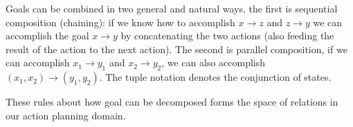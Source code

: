 Goals can be combined in two general and natural ways, the first is sequential composition (chaining): if we know how to accomplish $x\to z$ and $z\to y$ we can accomplish the goal $x \to y$ by concatenating the two actions (also feeding the result of the action to the next action). The second is parallel composition, if we can accomplish $x_1 \to y_1$ and $x_2 \to y_2$, we can also accomplish $(x_1,x_2) \to (y_1,y_2)$. The tuple notation denotes the conjunction of states. 

These rules about how goal can be decomposed forms the space of relations in our action planning domain.

\newcommand{\actionType}{
    \begin{minipage}{0.6\linewidth}
        {\begin{align*}
        \text{types} &= \{ \text{$s_1 \to s_2$ | $s_1,s_2 \in \text{WorldState}$} \}\\
        \text{WorldState} &= \{\text{Having $q$ | $q \in$ Quantified} \} \\
        &\cup \{\text{$x$ in machine | $x\in$ Quantified\}}\\
        &\cup \text{WorldState $\times$ WorldState}\\
        \text{Quantified} &= \{\text{$x$ amount of $y$ | $x \in\mathbb{R}\times$Unit, $y\in$ Entity}\}\\
        \text{Unit} &= \{\text{gram, milliliter, cup}\}\\
        \text{Entitiy} &= \{\text{coffee ground, coffee, water}\}
        \end{align*}}
    \end{minipage}
}



\newcommand{\actionToken}{
    \def\arraystretch{1}%
    \begin{Bmatrix}
        {\color{gray}\textbf{put $x$ in machine}} \\
        {\color{gray}\textbf{measure $x$ amount of $y$}}\\
        {\color{gray}\textbf{activate the machine}}
    \end{Bmatrix}
}

